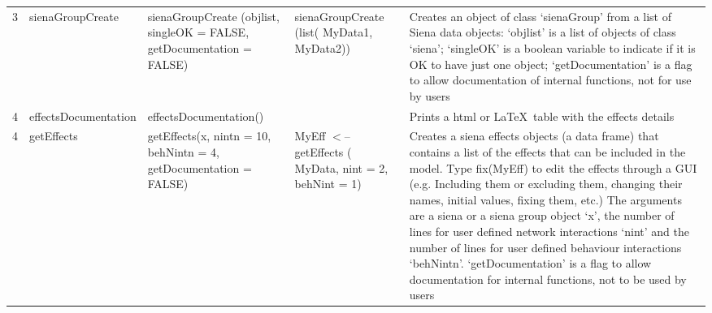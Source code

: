 \documentclass[a4paper,fleqn,11pt]{article}
\newcommand{\+}{\, + \,}
\begin{document}
\begin{landscape}
\begin{small}
\begin{longtable}{c | p{3.8cm} | p{4.5cm} | p{4.0cm} | p{7.4cm} }
3 & sienaGroupCreate & sienaGroupCreate (objlist, \newline
singleOK = FALSE, \newline
getDocumentation = FALSE) & sienaGroupCreate (list( \newline
MyData1, MyData2)) & Creates
an object of class `sienaGroup' from a list of Siena data objects:
`objlist' is a list of objects of class `siena'; `singleOK' is a boolean
variable to indicate if it is OK to have just one object; `getDocumentation'
is a flag to  allow documentation of internal functions, not for use by users\\

4 & effectsDocumentation &

effectsDocumentation() & & Prints a html or
\LaTeX\ table with the  effects details\\
\hline

4 & getEffects& getEffects(x, nintn = 10, \newline
behNintn = 4, \newline
getDocumentation = FALSE) &
MyEff $<$-- getEffects (\newline
MyData, nint = 2, \newline
behNint = 1) & Creates a siena effects
objects (a data frame) that contains a list of the effects that can be included
in the model.  Type fix(MyEff) to edit the effects through a GUI (e.g.
Including them or excluding them, changing their names, initial values, fixing
them, etc.) The arguments are a siena or a siena group object `x', the number
of lines for user defined network interactions `nint' and the number of lines
for user defined behaviour interactions `behNintn'. `getDocumentation' is a
flag to allow documentation for
internal functions, not to  be used by users\\
\hline


\end{longtable}
\end{small}
\end{landscape}
\end{document}
